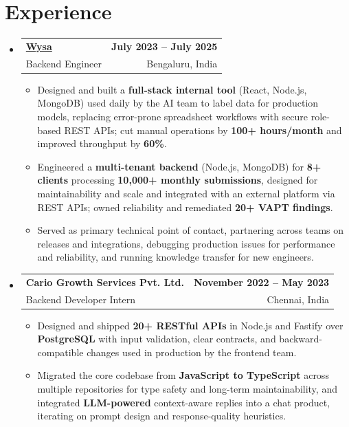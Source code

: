 \documentclass[letterpaper,10pt]{article}
\makeatletter
\newcommand{\resumeItem}[1]{
  \item\small{#1\vspace{-1pt}}
}
\newcommand{\resumeSubheading}[4]{
  \vspace{1pt}\item
    \begin{tabular*}{0.985\textwidth}[t]{l@{\extracolsep{\fill}}r}
      \textbf{#1} & \textbf{\small #2} \\
      {\small\color{ResumeSlate} #3} & {\small\color{ResumeSlate} #4} \\
    \end{tabular*}\vspace{-6pt}
}
\newcommand{\resumeSubHeadingListStart}{\begin{itemize}[leftmargin=0.0in, label={}, itemsep=2pt, topsep=2pt]}
\newcommand{\resumeSubHeadingListEnd}{\end{itemize}}
\newcommand{\resumeItemListStart}{\begin{itemize}[leftmargin=0.18in, itemsep=2pt, topsep=1pt]}
\newcommand{\resumeItemListEnd}{\end{itemize}\vspace{-4pt}}
\makeatother
\begin{document}
\section{Experience}
\resumeSubHeadingListStart
  \resumeSubheading
    {\href{https://www.wysa.io}{Wysa}}{July 2023 -- July 2025}
    {Backend Engineer}{Bengaluru, India}
    \resumeItemListStart
      \resumeItem{Designed and built a \textbf{full-stack internal tool} (React, Node.js, MongoDB) used daily by the AI team to label data for production models, replacing error-prone spreadsheet workflows with secure role-based REST APIs; cut manual operations by \textbf{100+ hours/month} and improved throughput by \textbf{60\%}.}
      \resumeItem{Engineered a \textbf{multi-tenant backend} (Node.js, MongoDB) for \textbf{8+ clients} processing \textbf{10{,}000+ monthly submissions}, designed for maintainability and scale and integrated with an external platform via REST APIs; owned reliability and remediated \textbf{20+ VAPT findings}.}
      \resumeItem{Served as primary technical point of contact, partnering across teams on releases and integrations, debugging production issues for performance and reliability, and running knowledge transfer for new engineers.}
    \resumeItemListEnd
  \resumeSubheading
    {Cario Growth Services Pvt. Ltd.}{November 2022 -- May 2023}
    {Backend Developer Intern}{Chennai, India}
    \resumeItemListStart
      \resumeItem{Designed and shipped \textbf{20+ RESTful APIs} in Node.js and Fastify over \textbf{PostgreSQL} with input validation, clear contracts, and backward-compatible changes used in production by the frontend team.}
      \resumeItem{Migrated the core codebase from \textbf{JavaScript to TypeScript} across multiple repositories for type safety and long-term maintainability, and integrated \textbf{LLM-powered} context-aware replies into a chat product, iterating on prompt design and response-quality heuristics.}
    \resumeItemListEnd
\resumeSubHeadingListEnd
\vspace{-4pt}
\end{document}

